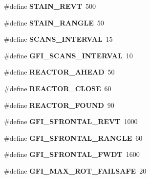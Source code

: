 \begin{DoxyCompactItemize}
\item 
\hypertarget{calibrate_8nxc_a23085c5995bfb533de15f749911735ee}{
\#define {\bfseries STAIN\_\-REVT}~500}
\label{calibrate_8nxc_a23085c5995bfb533de15f749911735ee}

\item 
\hypertarget{calibrate_8nxc_aa065f0a3dcd588addce086ed8e16ef21}{
\#define {\bfseries STAIN\_\-RANGLE}~50}
\label{calibrate_8nxc_aa065f0a3dcd588addce086ed8e16ef21}

\item 
\hypertarget{calibrate_8nxc_a0ffed1b076ac2fe20116fa0f0ae633f1}{
\#define {\bfseries SCANS\_\-INTERVAL}~15}
\label{calibrate_8nxc_a0ffed1b076ac2fe20116fa0f0ae633f1}

\item 
\hypertarget{calibrate_8nxc_a3c84fa327c80928102bf5fcd704df9e6}{
\#define {\bfseries GFI\_\-SCANS\_\-INTERVAL}~10}
\label{calibrate_8nxc_a3c84fa327c80928102bf5fcd704df9e6}

\item 
\hypertarget{calibrate_8nxc_ad57e5a239da13ddea4ab2548b177dcf3}{
\#define {\bfseries REACTOR\_\-AHEAD}~50}
\label{calibrate_8nxc_ad57e5a239da13ddea4ab2548b177dcf3}

\item 
\hypertarget{calibrate_8nxc_a900c7579f499cdcaf00704ae6598036a}{
\#define {\bfseries REACTOR\_\-CLOSE}~60}
\label{calibrate_8nxc_a900c7579f499cdcaf00704ae6598036a}

\item 
\hypertarget{calibrate_8nxc_a05ff785034efa7b287ee834f9ccb74f1}{
\#define {\bfseries REACTOR\_\-FOUND}~90}
\label{calibrate_8nxc_a05ff785034efa7b287ee834f9ccb74f1}

\item 
\hypertarget{calibrate_8nxc_ae981e3a47c44d4878baa7c830f5b846a}{
\#define {\bfseries GFI\_\-SFRONTAL\_\-REVT}~1000}
\label{calibrate_8nxc_ae981e3a47c44d4878baa7c830f5b846a}

\item 
\hypertarget{calibrate_8nxc_ae6cb54a3555702c9db09d084dba51143}{
\#define {\bfseries GFI\_\-SFRONTAL\_\-RANGLE}~60}
\label{calibrate_8nxc_ae6cb54a3555702c9db09d084dba51143}

\item 
\hypertarget{calibrate_8nxc_adee1b3613cfe237cecaba8f2d6f8ecdc}{
\#define {\bfseries GFI\_\-SFRONTAL\_\-FWDT}~1600}
\label{calibrate_8nxc_adee1b3613cfe237cecaba8f2d6f8ecdc}

\item 
\hypertarget{calibrate_8nxc_a24ced77f76e8a86e359fd77bc1ab9ce2}{
\#define {\bfseries GFI\_\-MAX\_\-ROT\_\-FAILSAFE}~20}
\label{calibrate_8nxc_a24ced77f76e8a86e359fd77bc1ab9ce2}


\end{DoxyCompactItemize}
